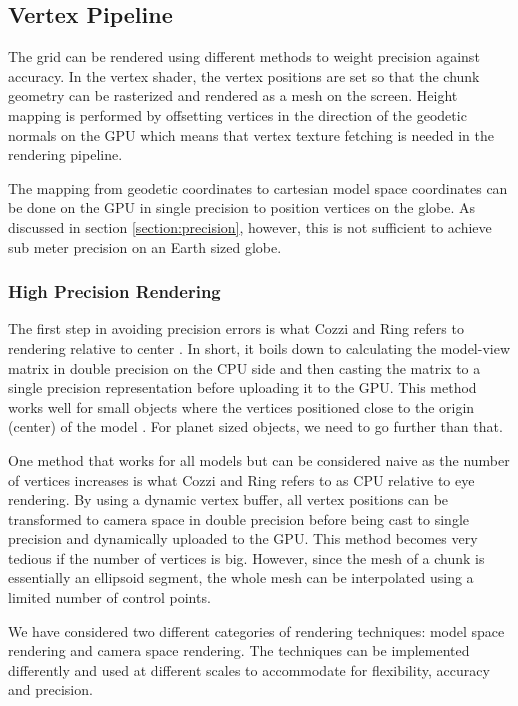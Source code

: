 \subsection{Vertex Pipeline}

The grid can be rendered using different methods to weight precision against accuracy. In the vertex shader, the vertex positions are set so that the chunk geometry can be rasterized and rendered as a mesh on the screen. Height mapping is performed by offsetting vertices in the direction of the geodetic normals on the GPU which means that vertex texture fetching is needed in the rendering pipeline.

The mapping from geodetic coordinates to cartesian model space coordinates can be done on the GPU in single precision to position vertices on the globe. As discussed in section \ref{section:precision}, however, this is not sufficient to achieve sub meter precision on an Earth sized globe.

\subsubsection{High Precision Rendering}

The first step in avoiding precision errors is what Cozzi and Ring refers to rendering relative to center \cite{cozzi11}. In short, it boils down to calculating the model-view matrix in double precision on the CPU side and then casting the matrix to a single precision representation before uploading it to the GPU. This method works well for small objects where the vertices positioned close to the origin (center) of the model \cite{cozzi11}. For planet sized objects, we need to go further than that.

One method that works for all models but can be considered naive as the number of vertices increases is what Cozzi and Ring refers to as CPU relative to eye rendering. By using a dynamic vertex buffer, all vertex positions can be transformed to camera space in double precision before being cast to single precision and dynamically uploaded to the GPU. This method becomes very tedious if the number of vertices is big. However, since the mesh of a chunk is essentially an ellipsoid segment, the whole mesh can be interpolated using a limited number of control points.

We have considered two different categories of rendering techniques: model space rendering and camera space rendering. The techniques can be implemented differently and used at different scales to accommodate for flexibility, accuracy and precision.

